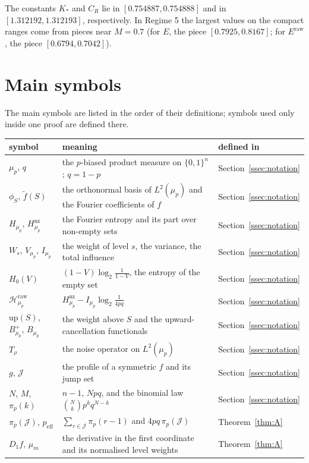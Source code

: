 \documentclass[11pt]{amsart}
\theoremstyle{remark}
\newcommand{\Hraw}{\mathcal{H}^{\mathrm{raw}}}
\newcommand{\up}{\mathrm{up}}
\newcommand{\peff}{p_{\mathrm{eff}}}
\newcommand{\J}{\mathcal{J}}
\newcommand{\ft}{\tilde f}
\begin{document}
The constants $K_*$ and $C_R$ lie in $[0.754887, 0.754888]$ and in $[1.312192, 1.312193]$, respectively. In Regime 5 the largest values on the compact ranges come from pieces near $M = 0.7$ (for $E$, the piece $[0.7925, 0.8167]$; for $E^{\mathrm{raw}}$, the piece $[0.6794, 0.7042]$).

\section{Main symbols}\label{app:notation}
The main symbols are listed in the order of their definitions; symbols used only inside one proof are defined there.

\begin{center}
\begin{tabular}{@{}lp{}l@{}}
\toprule
symbol & meaning & defined in \\
\midrule
$\mu_p$, $q$ & the $p$-biased product measure on $\{0,1\}^n$; $q = 1 - p$ & Section~\ref{ssec:notation} \\
$\phi_S$, $\ft(S)$ & the orthonormal basis of $L^2(\mu_p)$ and the Fourier coefficients of $f$ & Section~\ref{ssec:notation} \\
$H_{\mu_p}$, $H^{\mathrm{nz}}_{\mu_p}$ & the Fourier entropy and its part over non-empty sets & Section~\ref{ssec:notation} \\
$W_s$, $V_{\mu_p}$, $I_{\mu_p}$ & the weight of level $s$, the variance, the total influence & Section~\ref{ssec:notation} \\
$H_0(V)$ & $(1-V)\log_2\frac{1}{1-V}$, the entropy of the empty set & Section~\ref{ssec:notation} \\
$\Hraw_{\mu_p}$ & $H^{\mathrm{nz}}_{\mu_p} - I_{\mu_p}\log_2\frac{1}{4pq}$ & Section~\ref{ssec:notation} \\
$\up(S)$, $B^+_{\mu_p}$, $B_{\mu_p}$ & the weight above $S$ and the upward-cancellation functionals & Section~\ref{ssec:notation} \\
$T_\rho$ & the noise operator on $L^2(\mu_p)$ & Section~\ref{ssec:notation} \\
$g$, $\J$ & the profile of a symmetric $f$ and its jump set & Section~\ref{ssec:notation} \\
$N$, $M$, $\pi_p(k)$ & $n - 1$, $Npq$, and the binomial law $\binom{N}{k}p^kq^{N-k}$ & Section~\ref{ssec:notation} \\
$\pi_p(\J)$, $\peff$ & $\sum_{r \in \J}\pi_p(r-1)$ and $4pq\,\pi_p(\J)$ & Theorem~\ref{thm:A} \\
$D_1 f$, $\mu_m$ & the derivative in the first coordinate and its normalised level weights & Theorem~\ref{thm:A} \\

\end{tabular}
\end{center}
\end{document}
